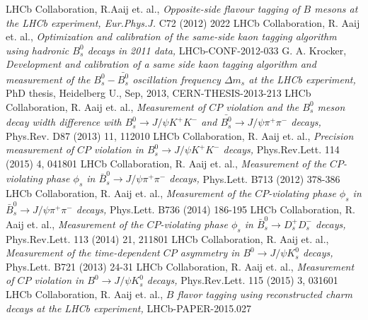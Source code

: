 \documentclass{PoS}
\begin{document}
\begin{thebibliography}{99}
LHCb Collaboration, R.Aaij et. al., {\it Opposite-side flavour tagging of $B$ mesons at the LHCb experiment, Eur.Phys.J.} C72 (2012) 2022
LHCb Collaboration, R. Aaij et. al., {\it Optimization and calibration of the same-side kaon \mbox{tagging} algorithm using hadronic $B_s^0$ decays in 2011 data,} LHCb-CONF-2012-033
 G. A. Krocker, {\it Development and calibration of a same side kaon tagging algorithm and measurement of the $B_s^0-\bar{B_s^0}$ oscillation frequency $\Delta m_s$ at the LHCb experiment, } PhD thesis, Heidelberg U., Sep, 2013, CERN-THESIS-2013-213
LHCb Collaboration, R. Aaij et. al., {\it Measurement of $C\!P$ violation and the $B_s^0$ meson decay width difference with   $B_s^0\to J\!/\!\psi K^+K^-$ and \mbox{$\bar{B_s^0}\to J\!/\!\psi \pi^+\pi^-$} decays, } Phys.Rev. D87 (2013) 11, 112010
LHCb Collaboration, R. Aaij et. al., {\it Precision measurement of $C\!P$ violation in $B_s^0\to J\!/\!\psi K^+K^-$ decays, } Phys.Rev.Lett. 114 (2015) 4, 041801
 LHCb Collaboration, R. Aaij et. al., {\it Measurement of the $C\!P$-violating phase $\phi_s$ in $\bar{B}_s^0\to J\!/\!\psi \pi^+\pi^-$ decays, } Phys.Lett. B713 (2012) 378-386
 LHCb Collaboration, R. Aaij et. al., {\it Measurement of the $C\!P$-violating phase $\phi_s$ in $\bar{B}_s^0\to J\!/\!\psi \pi^+\pi^-$ decays, } Phys.Lett. B736 (2014) 186-195
 LHCb Collaboration, R. Aaij et. al., {\it Measurement of the $C\!P$-violating phase $\phi_s$ in $\bar{B}_s^0\to D_s^+D_s^-$ decays, } Phys.Rev.Lett. 113 (2014) 21, 211801
 LHCb Collaboration, R. Aaij et. al., {\it Measurement of the time-dependent $C\!P$ asymmetry in $B^0\to J\!/\!\psi K_s^0$ decays, } Phys.Lett. B721 (2013) 24-31
 LHCb Collaboration, R. Aaij et. al., {\it Measurement of $C\!P$ violation in \mbox{$B^0\to J\!/\!\psi K_s^0$} decays, } Phys.Rev.Lett. 115 (2015) 3, 031601
 LHCb Collaboration, R. Aaij et. al., {\it $B$ flavor tagging using reconstructed charm decays at the LHCb experiment, } LHCb-PAPER-2015.027

\end{thebibliography} 
\end{document}
